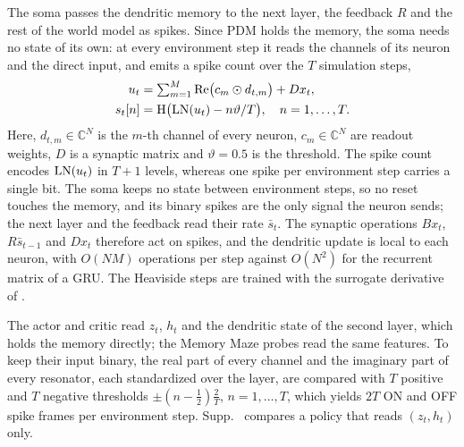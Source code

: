 The soma passes the dendritic memory to the next layer, the feedback $R$ and the rest of the world model as spikes.
Since PDM holds the memory, the soma needs no state of its own: at every environment step it reads the channels of its neuron and the direct input, and emits a spike count over the $T$ simulation steps,
\begin{equation}
\begin{aligned}
u_t &= \textstyle\sum_{m=1}^{M} \mathrm{Re}\big(c_m \odot d_{t,m}\big) + D x_t,\\
s_t[n] &= \mathrm{H}\big(\mathrm{LN}(u_t) - n\vartheta/T\big), \quad n=1,\dots,T.
\end{aligned}
\label{eq:soma}
\end{equation}
Here, $d_{t,m}\in\mathbb{C}^{N}$ is the $m$-th channel of every neuron, $c_m\in\mathbb{C}^{N}$ are readout weights, $D$ is a synaptic matrix and $\vartheta=0.5$ is the threshold.
The spike count encodes $\mathrm{LN}(u_t)$ in $T+1$ levels, whereas one spike per environment step carries a single bit.
The soma keeps no state between environment steps, so no reset touches the memory, and its binary spikes are the only signal the neuron sends; the next layer and the feedback read their rate $\bar s_t$.
The synaptic operations $Bx_t$, $R\bar s_{t-1}$ and $Dx_t$ therefore act on spikes, and the dendritic update is local to each neuron, with $O(NM)$ operations per step against $O(N^2)$ for the recurrent matrix of a GRU.
The Heaviside steps are trained with the surrogate derivative of \swm.

The actor and critic read $z_t$, $h_t$ and the dendritic state of the second layer, which holds the memory directly; the Memory Maze probes read the same features.
To keep their input binary, the real part of every channel and the imaginary part of every resonator, each standardized over the layer, are compared with $T$ positive and $T$ negative thresholds $\pm(n-\tfrac12)\tfrac{2}{T}$, $n=1,\dots,T$, which yields $2T$ ON and OFF spike frames per environment step.
Supp.~ compares a policy that reads $(z_t,h_t)$ only.
